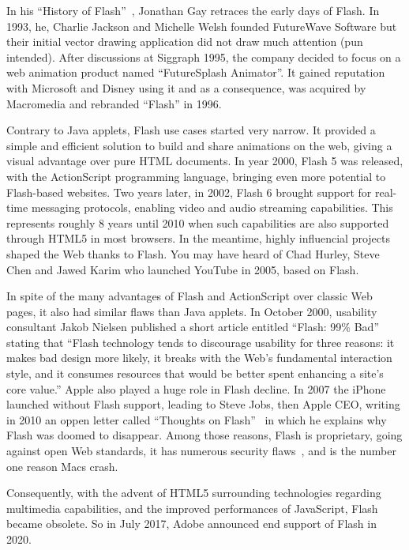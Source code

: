 In his ``History of Flash''~\cite{HistoryFlash}, Jonathan Gay retraces the early days of Flash.
In 1993, he, Charlie Jackson and Michelle Welsh founded FutureWave Software
but their initial vector drawing application did not draw much attention (pun intended).
After discussions at Siggraph 1995, the company decided to focus on a web animation
product named ``FutureSplash Animator''.
It gained reputation with Microsoft and Disney using it and as a consequence,
was acquired by Macromedia and rebranded ``Flash'' in 1996.

Contrary to Java applets, Flash use cases started very narrow.
It provided a simple and efficient solution to build and share animations on the web,
giving a visual advantage over pure HTML documents.
In year 2000, Flash 5 was released, with the ActionScript programming language,
bringing even more potential to Flash-based websites.
Two years later, in 2002, Flash 6 brought support for real-time messaging protocols,
enabling video and audio streaming capabilities.
This represents roughly 8 years until 2010 when such capabilities are also
supported through HTML5 in most browsers.
In the meantime, highly influencial projects shaped the Web thanks to Flash.
You may have heard of Chad Hurley, Steve Chen and Jawed Karim who launched
YouTube in 2005, based on Flash.

In spite of the many advantages of Flash and ActionScript over classic Web pages,
it also had similar flaws than Java applets.
In October 2000, usability consultant Jakob Nielsen published a short article
entitled ``Flash: 99\% Bad''~\cite{FlashBadNielsen} stating that
``Flash technology tends to discourage usability for three reasons:
it makes bad design more likely,
it breaks with the Web's fundamental interaction style,
and it consumes resources that would be better spent enhancing a site's core value.''
Apple also played a huge role in Flash decline.
In 2007 the iPhone launched without Flash support,
leading to Steve Jobs, then Apple CEO, writing in 2010 an oppen letter called
``Thoughts on Flash''~\cite{FlashJobs}
in which he explains why Flash was doomed to disappear.
Among those reasons, Flash is proprietary, going against open Web standards,
it has numerous security flaws~\cite{FlashCVE}, and is the number one reason Macs crash.

Consequently, with the advent of HTML5 surrounding technologies regarding multimedia capabilities,
and the improved performances of JavaScript, Flash became obsolete.
So in July 2017, Adobe announced end support of Flash in 2020.

